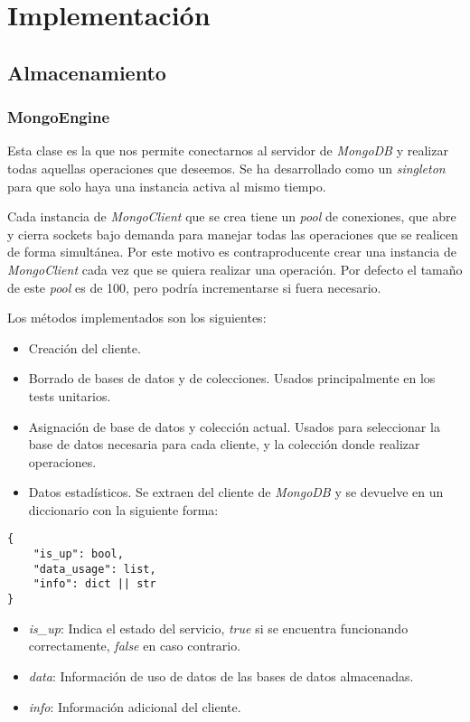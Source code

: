 \chapter{Implementación}



\section{Almacenamiento}

\subsection{MongoEngine}
\label{sec:mongoengine}

Esta clase es la que nos permite conectarnos al servidor de \textit{MongoDB} y realizar todas aquellas operaciones que deseemos. Se ha desarrollado como un \textit{singleton} para que solo haya una instancia activa al mismo tiempo.

Cada instancia de \textit{MongoClient} que se crea tiene un \textit{pool} de conexiones, que abre y cierra sockets bajo demanda para manejar todas las operaciones que se realicen de forma simultánea. Por este motivo es contraproducente crear una instancia de \textit{MongoClient} cada vez que se quiera realizar una operación. Por defecto el tamaño de este \textit{pool} es de 100, pero podría incrementarse si fuera necesario.

\bigskip
Los métodos implementados son los siguientes:
\begin{itemize}
	\item Creación del cliente.
	\item Borrado de bases de datos y de colecciones. Usados principalmente en los tests unitarios.
	\item Asignación de base de datos y colección actual. Usados para seleccionar la base de datos necesaria para cada cliente, y la colección donde realizar operaciones.
	\item Datos estadísticos. Se extraen del cliente de \textit{MongoDB} y se devuelve en un diccionario con la siguiente forma:
\end{itemize}

\pagebreak
\begin{lstlisting}
{
	"is_up": bool,
	"data_usage": list,
	"info": dict || str
}
\end{lstlisting}

\begin{itemize}
	\item \textit{is\_up}: Indica el estado del servicio, \textit{true} si se encuentra funcionando correctamente, \textit{false} en caso contrario.
	\item \textit{data}: Información de uso de datos de las bases de datos almacenadas.
	\item \textit{info}: Información adicional del cliente.
\end{itemize}



